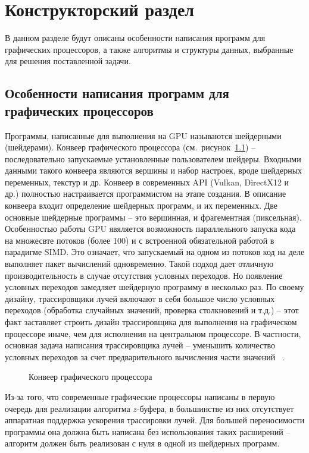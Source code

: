 \chapter{Конструкторский раздел}

В данном разделе будут описаны особенности написания программ для
графических процессоров, а также алгоритмы и структуры данных,
выбранные для решения поставленной задачи.

\section{Особенности написания программ для графических процессоров}

Программы, написанные для выполнения на GPU называются шейдерными (шейдерами).
Конвеер графического процессора (см.~рисунок~\ref{img:pipeline}) -- 
последовательно запускаемые установленные пользователем 
шейдеры. Входными данными такого конвеера являются вершины и набор
настроек, вроде шейдерных переменных, текстур и др.
Конвеер в современных API (Vulkan, DirectX12 и др.) полностью настраивается 
программистом на этапе создания. В описание конвеера входит определение
шейдерных программ, и их переменных. Две основные шейдерные
программы -- это вершинная, и фрагементная (пиксельная). 
Особенностью работы GPU явяляется возможность параллельного запуска 
кода на множесвте потоков (более 100) и с встроенной обязательной работой 
в парадигме SIMD. Это означает, что запускаемый на одном из потоков код
на деле выполняет пакет вычислений одновременно. Такой подход дает 
отличную производительность в случае отсутствия условных переходов. Но 
появление условных переходов замедляет шейдерную программу в несколько раз.
По своему дизайну, трассировщики лучей включают в себя большое число условных
переходов (обработка случайных значений, проверка столкновений и т.д.) -- 
этот факт заставляет строить дизайн трассировщика для выполнения на графическом
процессоре иначе, чем для исполнения на центральном процессоре. В частности,
основная задача написания трассировщика лучей -- уменьшить количество 
условных переходов за счет предварительного вычисления части значений
~\cite{Vulkan}.

\begin{figure}[!ht]
  \centering
  
  \caption{Конвеер графического процессора}
  \label{img:pipeline}
\end{figure}

Из-за того, что современные графические процессоры написаны в первую очередь
для реализации алгоритма $z$-буфера, в большинстве из них
отсутствует аппаратная поддержка ускорения трассировки лучей. Для большей переносимости программы она должна быть написана без использования таких расширений -- алгоритм 
должен быть реализован с нуля в одной из шейдерных программ.

